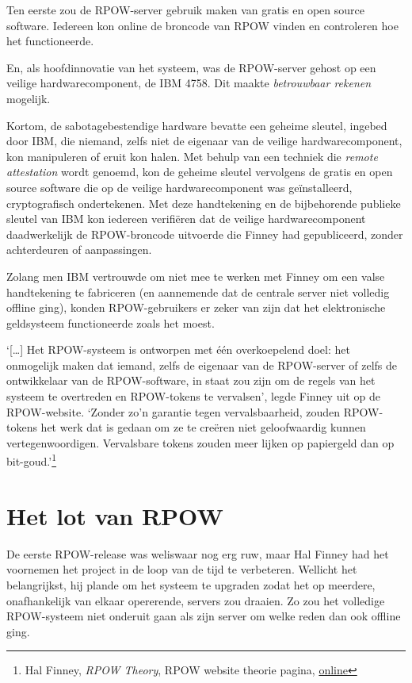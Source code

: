 \documentclass[
  a5paper,
  smalldemyvopaper,11pt,twoside,onecolumn,openright,extrafontsizes,
hidelinks]{memoir}
\begin{document}
Ten eerste zou de RPOW-server gebruik maken van gratis en open source
software. Iedereen kon online de broncode van RPOW vinden en controleren
hoe het functioneerde.

En, als hoofdinnovatie van het systeem, was de RPOW-server gehost op een
veilige hardwarecomponent, de IBM 4758. Dit maakte \emph{betrouwbaar
rekenen} mogelijk.

Kortom, de sabotagebestendige hardware bevatte een geheime sleutel,
ingebed door IBM, die niemand, zelfs niet de eigenaar van de veilige
hardwarecomponent, kon manipuleren of eruit kon halen. Met behulp van
een techniek die \emph{remote attestation} wordt genoemd, kon de geheime
sleutel vervolgens de gratis en open source software die op de veilige
hardwarecomponent was geïnstalleerd, cryptografisch ondertekenen. Met
deze handtekening en de bijbehorende publieke sleutel van IBM kon
iedereen verifiëren dat de veilige hardwarecomponent daadwerkelijk de
RPOW-broncode uitvoerde die Finney had gepubliceerd, zonder achterdeuren
of aanpassingen.

Zolang men IBM vertrouwde om niet mee te werken met Finney om een valse
handtekening te fabriceren (en aannemende dat de centrale server niet
volledig offline ging), konden RPOW-gebruikers er zeker van zijn dat het
elektronische geldsysteem functioneerde zoals het moest.

`{[}\ldots{]} Het RPOW-systeem is ontworpen met één overkoepelend doel:
het onmogelijk maken dat iemand, zelfs de eigenaar van de RPOW-server of
zelfs de ontwikkelaar van de RPOW-software, in staat zou zijn om de
regels van het systeem te overtreden en RPOW-tokens te vervalsen', legde
Finney uit op de RPOW-website. `Zonder zo'n garantie tegen
vervalsbaarheid, zouden RPOW-tokens het werk dat is gedaan om ze te
creëren niet geloofwaardig kunnen vertegenwoordigen. Vervalsbare tokens
zouden meer lijken op papiergeld dan op bit-goud.'\footnote{Hal Finney,
  \emph{RPOW Theory}, RPOW website theorie pagina,
  \href{https://web.archive.org/web/20040815154951/http://rpow.net/theory.html}{online}}

\section{Het lot van RPOW}\label{het-lot-van-rpow}

De eerste RPOW-release was weliswaar nog erg ruw, maar Hal Finney had
het voornemen het project in de loop van de tijd te verbeteren. Wellicht
het belangrijkst, hij plande om het systeem te upgraden zodat het op
meerdere, onafhankelijk van elkaar opererende, servers zou draaien. Zo
zou het volledige RPOW-systeem niet onderuit gaan als zijn server om
welke reden dan ook offline ging.
\end{document}
